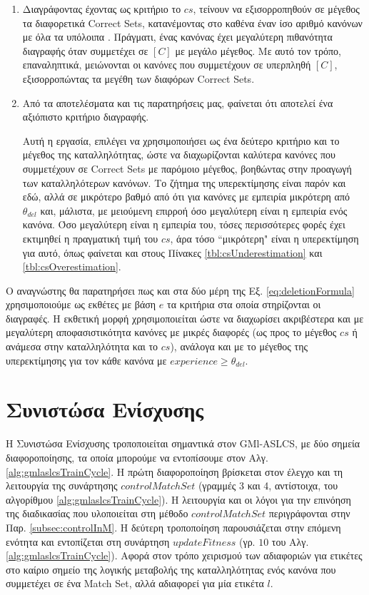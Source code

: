 \begin{enumerate}
\item Διαγράφοντας έχοντας ως κριτήριο το $cs$,  τείνουν να εξισορροπηθούν σε μέγεθος τα διαφορετικά Correct Sets, κατανέμοντας στο καθένα έναν ίσο αριθμό κανόνων με όλα τα υπόλοιπα \cite{XCS}. Πράγματι, ένας κανόνας έχει μεγαλύτερη πιθανότητα διαγραφής όταν συμμετέχει σε $[C]$ με μεγάλο μέγεθος. Με αυτό τον τρόπο, επαναληπτικά, μειώνονται οι κανόνες που συμμετέχουν σε υπερπληθή $[C]$, εξισορροπώντας τα μεγέθη των διαφόρων Correct Sets.

\item Από τα αποτελέσματα και τις παρατηρήσεις μας, φαίνεται ότι αποτελεί ένα αξιόπιστο κριτήριο διαγραφής. 

Αυτή η εργασία, επιλέγει να χρησιμοποιήσει ως ένα δεύτερο κριτήριο και το μέγεθος της καταλληλότητας, ώστε να διαχωρίζονται καλύτερα κανόνες που συμμετέχουν σε Correct Sets με παρόμοιο μέγεθος, βοηθώντας στην προαγωγή των καταλληλότερων κανόνων. Το ζήτημα της υπερεκτίμησης είναι παρόν και εδώ, αλλά σε μικρότερο βαθμό από ότι για κανόνες με εμπειρία μικρότερη από $\theta_{del}$ και, μάλιστα, με μειούμενη επιρροή όσο μεγαλύτερη είναι η εμπειρία ενός κανόνα. Όσο μεγαλύτερη είναι η εμπειρία του, τόσες περισσότερες φορές έχει εκτιμηθεί η πραγματική τιμή του $cs$, άρα τόσο “μικρότερη" είναι η υπερεκτίμηση για αυτό, όπως φαίνεται και στους Πίνακες \ref{tbl:csUnderestimation} και \ref{tbl:csOverestimation}.
\end{enumerate}

  
Ο αναγνώστης θα παρατηρήσει πως και στα δύο μέρη της Εξ. \ref{eq:deletionFormula} χρησιμοποιούμε ως εκθέτες με βάση $e$ τα κριτήρια στα οποία στηρίζονται οι διαγραφές. Η εκθετική μορφή χρησιμοποιείται ώστε να διαχωρίσει ακριβέστερα και με μεγαλύτερη αποφασιστικότητα κανόνες με μικρές διαφορές (ως προς το μέγεθος $cs$ ή ανάμεσα στην καταλληλότητα και το $cs$), ανάλογα και με το μέγεθος της υπερεκτίμησης για τον κάθε κανόνα με $experience \geq \theta_{del}$.





\section{Συνιστώσα Ενίσχυσης}
Η Συνιστώσα Ενίσχυσης τροποποιείται σημαντικά στον GMl-ASLCS, με δύο σημεία διαφοροποίησης, τα οποία μπορούμε να εντοπίσουμε στον Αλγ. \ref{alg:gmlaslcsTrainCycle}. Η πρώτη διαφοροποίηση βρίσκεται στον έλεγχο και τη λειτουργία της συνάρτησης $controlMatchSet$ (γραμμές 3 και 4, αντίστοιχα, του αλγορίθμου \ref{alg:gmlaslcsTrainCycle}). Η λειτουργία και οι λόγοι για την επινόηση της διαδικασίας που υλοποιείται στη μέθοδο $controlMatchSet$ περιγράφονται στην Παρ. \ref{subsec:controlInM}. Η δεύτερη τροποποίηση παρουσιάζεται στην επόμενη ενότητα και εντοπίζεται στη συνάρτηση $updateFitness$ (γρ. $10$ του Αλγ. \ref{alg:gmlaslcsTrainCycle}). Αφορά στον τρόπο χειρισμού των αδιαφοριών για ετικέτες στο καίριο σημείο της λογικής μεταβολής της καταλληλότητας ενός κανόνα που συμμετέχει σε ένα Match Set, αλλά αδιαφορεί για μία ετικέτα $l$.


